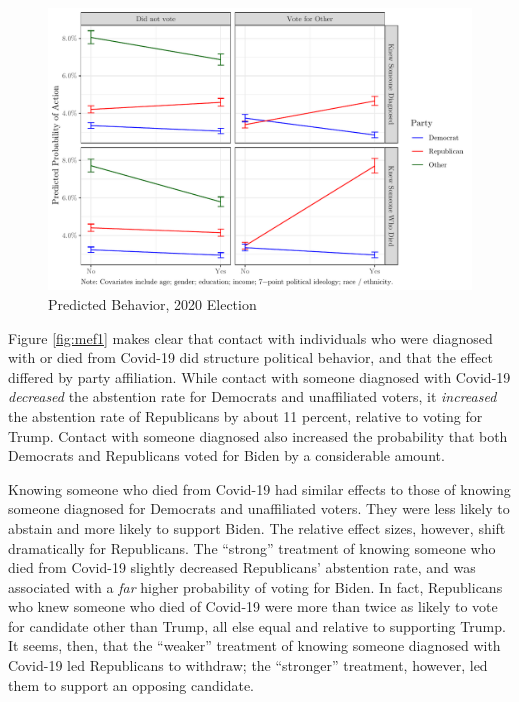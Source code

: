 \documentclass[
  12pt,
]{article}
\begin{document}
\begin{figure}[!htbp]

{\centering \includegraphics{theory_paper_files/figure-latex/mef1-c-1} 

}

\caption{\label{fig:mef1}Predicted Behavior, 2020 Election}\label{fig:mef1-c}
\end{figure}

Figure \ref{fig:mef1} makes clear that contact with individuals who were diagnosed with or died from Covid-19 did structure political behavior, and that the effect differed by party affiliation. While contact with someone diagnosed with Covid-19 \emph{decreased} the abstention rate for Democrats and unaffiliated voters, it \emph{increased} the abstention rate of Republicans by about 11 percent, relative to voting for Trump. Contact with someone diagnosed also increased the probability that both Democrats and Republicans voted for Biden by a considerable amount.

Knowing someone who died from Covid-19 had similar effects to those of knowing someone diagnosed for Democrats and unaffiliated voters. They were less likely to abstain and more likely to support Biden. The relative effect sizes, however, shift dramatically for Republicans. The ``strong'' treatment of knowing someone who died from Covid-19 slightly decreased Republicans' abstention rate, and was associated with a \emph{far} higher probability of voting for Biden. In fact, Republicans who knew someone who died of Covid-19 were more than twice as likely to vote for candidate other than Trump, all else equal and relative to supporting Trump. It seems, then, that the ``weaker'' treatment of knowing someone diagnosed with Covid-19 led Republicans to withdraw; the ``stronger'' treatment, however, led them to support an opposing candidate.
\end{document}
